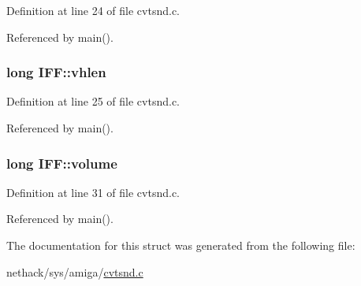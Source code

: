 Definition at line 24 of file cvtsnd.\+c.



Referenced by main().

\hypertarget{structIFF_a2d78f63486ac3ea85cf56abad568295d}{
\subsubsection[{vhlen}]{\setlength{\rightskip}{0pt plus 5cm}long I\+F\+F\+::vhlen}}\label{structIFF_a2d78f63486ac3ea85cf56abad568295d}


Definition at line 25 of file cvtsnd.\+c.



Referenced by main().

\hypertarget{structIFF_a4dd05840f2c7166d7d5400802f7f148d}{
\subsubsection[{volume}]{\setlength{\rightskip}{0pt plus 5cm}long I\+F\+F\+::volume}}\label{structIFF_a4dd05840f2c7166d7d5400802f7f148d}


Definition at line 31 of file cvtsnd.\+c.



Referenced by main().



The documentation for this struct was generated from the following file\+:\begin{DoxyCompactItemize}
\item 
nethack/sys/amiga/\hyperlink{cvtsnd_8c}{cvtsnd.\+c}\end{DoxyCompactItemize}
